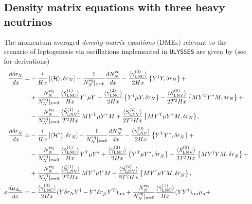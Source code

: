 \documentclass[12pt, a4paper]{article}
\def\LNC{\text{LNC}}
\def\LNV{\text{LNV}}
\begin{document}
\subsection{Density matrix equations with three heavy neutrinos}
\label{sec:DMEs}
%

The momentum-averaged \textit{density matrix equations} (DMEs) relevant to the scenario of leptogenesis via oscillations implemented in \texttt{ULYSSES} are given by (see \cite{Drewes:2016gmt,Hernandez:2016kel,Ghiglieri:2017gjz, Eijima:2017anv} for derivations)
\allowdisplaybreaks
\begin{subequations}
\begin{align}
\label{eq:DME_N}
\frac{d\delta r_N}{dx} = &-\frac{i}{Hx}\left[\langle \mathcal{H}\rangle,\delta r_N\right]-\frac{1}{N_{N}^{\rm eq}|_{x=0}}\frac{dN_{N}^{\rm eq}}{dx}- \frac{\langle\gamma_{\LNC}^{(0)}\rangle}{2Hx}\left\{Y^\dagger Y,\delta r_N\right\} +\nonumber\\&+ \frac{N_N^{\rm eq}}{N_N^{\rm eq}|_{x=0}}{}\frac{\langle\tilde{\gamma}_{\LNC}^{(1)}\rangle}{Hx} Y^\dagger \mu Y -\frac{\langle\gamma_{\LNC}^{(2)}\rangle}{2Hx}\left\{Y^\dagger\mu Y,\delta r_N\right\} - \frac{\langle S_{\LNV}^{(0)}\rangle}{2T^2Hx}\left\{ MY^{\rm T}Y^*M,\delta r_N\right\}+\nonumber\\
& - \frac{N_N^{\rm eq}}{N_N^{\rm eq}|_{x=0}}\frac{\langle \tilde{S}_{\LNV}^{(1)}\rangle}{T^2Hx}\,M Y^{\rm T}\mu Y^* M + \frac{\langle S_{\LNV}^{(2)}\rangle}{2T^2Hx}\left\{MY^{\rm T}\mu Y^* M,\delta r_N\right\},\\
\label{eq:DME_Nbar}
\frac{d\delta r_{\bar{N}}}{dx} = &-\frac{i}{Hx}\left[\langle \mathcal{H^*}\rangle,\delta r_{\bar{N}}\right]-\frac{1}{N_{N}^{\rm eq}|_{x=0}}\frac{dN_{N}^{\rm eq}}{dx}- \frac{\langle\gamma_{\LNC}^{(0)}\rangle}{2Hx}\left\{Y^{\rm T} Y^*,\delta r_{\bar{N}}\right\} +\nonumber\\&- \frac{N_N^{\rm eq}}{N_N^{\rm eq}|_{x=0}}\frac{\langle\tilde{\gamma}_{\LNC}^{(1)}\rangle}{Hx} Y^T \mu Y^* +\frac{\langle\gamma_{\LNC}^{(2)}\rangle}{2Hx}\left\{Y^{\rm T}\mu Y^*,\delta r_{\bar{N}}\right\} - \frac{\langle S_{\LNV}^{(0)}\rangle}{2T^2Hx}\left\{ MY^{\dagger}YM,\delta r_{\bar{N}}\right\}+\nonumber\\
& + \frac{N_N^{\rm eq}}{N_N^{\rm eq}|_{x=0}}\frac{\langle \tilde{S}_{\LNV}^{(1)}\rangle}{T^2Hx}\,M Y^{\dagger}\mu Y M - \frac{\langle S_{\LNV}^{(2)}\rangle}{2T^2Hx}\left\{MY^{\dagger}\mu Y M,\delta r_{\bar{N}}\right\},\\
\kappa \frac{d\mu_{\Delta_\alpha}}{dx} = &-\frac{\langle\gamma_{\LNC}^{(0)}\rangle}{2Hx}(Y\delta r_NY^\dagger-Y^* \delta r_{\bar{N}}Y^{\rm T})_{\alpha\alpha} + \frac{N_N^{\rm eq}}{N_N^{\rm eq}|_{x=0}}\frac{\langle\tilde{\gamma}_{\LNC}^{(1)}\rangle}{Hx}(YY^\dagger)_{\alpha\alpha}\mu_\alpha+\nonumber\\

\end{align}
\end{subequations}
\end{document}

